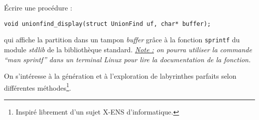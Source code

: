 \documentclass[../../../main.tex]{subfiles}
\begin{document}
 Écrire une procédure :
\begin{center}
\texttt{void unionfind_display(struct UnionFind uf, char* buffer);}
\end{center}
qui affiche la partition dans un tampon \textit{buffer} grâce à la fonction \texttt{sprintf} du module \textit{stdlib} de la bibliothèque standard.\newline
\textit{\underline{Note :} on pourra utiliser la commande ``man sprintf'' dans un terminal Linux pour lire la documentation de la fonction.}

 On s'intéresse à la génération et à l'exploration de labyrinthes parfaits selon différentes méthodes\footnote{Inspiré librement d'un sujet X-ENS d'informatique.}.
\end{document}
